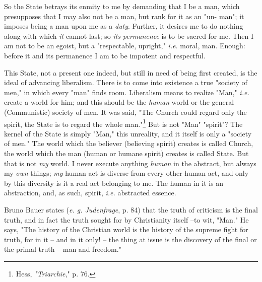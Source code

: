 \documentclass[a4paper]{book}
\begin{document}
So the State betrays its enmity to me by demanding that I be a man, which 
presupposes that I may also not be a man, but rank for it as an "{}un- man"{}; 
it imposes being a man upon me as a \textit{duty}. Further, it desires me to 
do nothing along with which \textit{it} cannot last; so \textit{its 
permanence} is to be sacred for me. Then I am not to be an egoist, but a 
"{}respectable, upright,"{} \textit{i.e.} moral, man. Enough: before it and 
its permanence I am to be impotent and respectful.

This State, not a present one indeed, but still in need of being first 
created, is the ideal of advancing liberalism. There is to come into existence 
a true "{}society of men,"{} in which every "{}man"{} finds room. Liberalism 
means to realize "{}Man,"{} \textit{i.e.} create a world for him; and this 
should be the \textit{human} world or the general (Communistic) society of 
men. It was said, "{}The Church could regard only the spirit, the State is to 
regard the whole man."{}\footnote{Hess, \textit{"{}Triarchie},"{} p. 76.} But 
is not "{}Man"{} "{}spirit"{}? The kernel of the State is simply "{}Man,"{} 
this unreality, and it itself is only a "{}society of men."{} The world which 
the believer (believing spirit) creates is called Church, the world which the 
man (human or humane spirit) creates is called State. But that is not 
\textit{my} world. I never execute anything \textit{human} in the abstract, 
but always my \textit{own} things; \textit{my} human act is diverse from every 
other human act, and only by this diversity is it a real act belonging to me. 
The human in it is an abstraction, and, as such, spirit, \textit{i.e.} 
abstracted essence.

Bruno Bauer states (\textit{e. g. Judenfrage}, p. 84) that the truth of 
criticism is the final truth, and in fact the truth sought for by Christianity 
itself --to wit, "{}Man."{} He says, "{}The history of the Christian world is 
the history of the supreme fight for truth, for in it -- and in it only! -- 
the thing at issue is the discovery of the final or the primal truth -- man 
and freedom."{}
\end{document}
